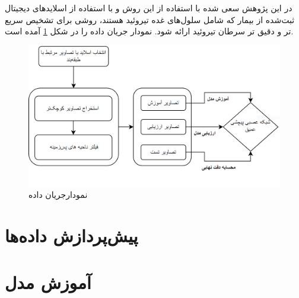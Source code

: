 
در این پژوهش سعی شده با استفاده از این روش و با استفاده از اسلاید‌های دیجیتال ثبت‌شده از بیمار که شامل سلول‌های غده تیروئید هستند، روشی برای تشخیص سریع تر و دقیق تر سرطان تیروئید ارائه شود.
نمودار جریان داده را در شکل \ref{thesis_method_flowchart} آمده است.
\begin{figure}
	\begin{center}
		\vspace{0.5cm}
		\includegraphics[width=\linewidth]{figs/suggested_methods/chart.PNG}
	\end{center}
	\caption{نمودارجریان داده}
	\label{thesis_method_flowchart}
\end{figure}


\section{پیش‌پردازش داده‌ها}\label{sec:پیش-پردازش-داده-ها}



\section{آموزش مدل}\label{sec:آموزش مدل}

